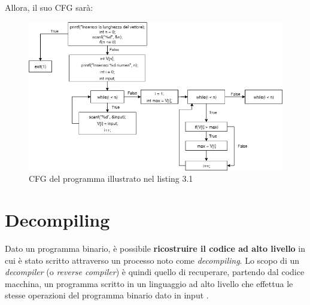 \documentclass[../main.tex]{subfiles}
\begin{document}
Allora, il suo CFG sarà: \newline
\begin{figure}[H]
    \centering
    \includegraphics[width = 1\linewidth]{../images/CFG.drawio.png}
    \caption{CFG del programma illustrato nel listing 3.1}
\end{figure}




\section{Decompiling}
Dato un programma binario, è possibile \textbf{ricostruire il codice ad alto livello} in cui è stato scritto attraverso un processo noto come \textit{decompiling}.
Lo scopo di un \textit{decompiler} (o \textit{reverse compiler}) è quindi quello di recuperare, partendo dal codice macchina, un programma scritto in un linguaggio ad alto livello che effettua le stesse
operazioni del programma binario dato in input \cite{Cifuentes1995DecompilationOB}.
\end{document}
